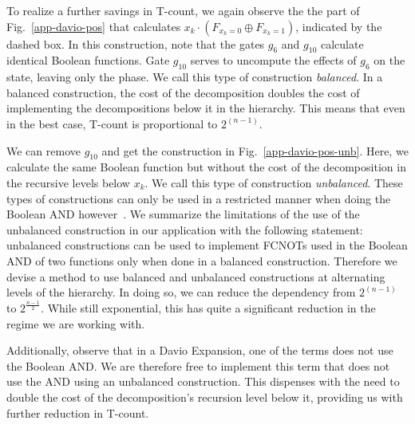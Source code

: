 \documentclass[a4paper]{article}
\begin{document}
{To realize a further savings in T-count, we again observe the the part of Fig.~\ref{app-davio-pos} that calculates
$x_k \cdot (F_{x_k = 0} \oplus F_{x_k = 1})$, indicated by the dashed box. In this construction, note that the
gates $g_{6}$ and $g_{10}$ calculate identical Boolean functions. Gate $g_{10}$ serves to uncompute the effects of $g_6$ on the state, leaving only the phase. We call this type of construction \emph{balanced}. In a balanced construction, the cost of the decomposition doubles the cost of implementing the decompositions below it in the hierarchy. This means that even in the best case, T-count is proportional to $2^{(n-1)}$.

We can remove $g_{10}$ and get the construction in Fig.~\ref{app-davio-pos-unb}. Here, we calculate the same
Boolean function but without the cost of the decomposition in the recursive levels below $x_k$. We call this type
of construction \emph{unbalanced}. These types of constructions can only be used in a restricted manner when doing
the Boolean AND however~\cite{bib-amy-phase-state}. We summarize the limitations of the use of the unbalanced
construction in our application with the following statement: unbalanced constructions can be used to implement
FCNOTs used in the Boolean AND of two functions only when done in a balanced construction. Therefore we devise a method
to use balanced and unbalanced constructions at alternating levels of the hierarchy. In doing so, we can reduce the
dependency from $2^{(n-1)}$ to $2^{\frac{n-1}{2}}$. While still exponential, this has quite a significant reduction
in the regime we are working with. 

Additionally, observe that in a Davio Expansion, one of the terms does not use the Boolean AND. We are therefore
free to implement this term that does not use the AND using an unbalanced construction. This dispenses with the
need to double the cost of the decomposition's recursion level below it, providing us with further reduction
in T-count.

}
\end{document}
